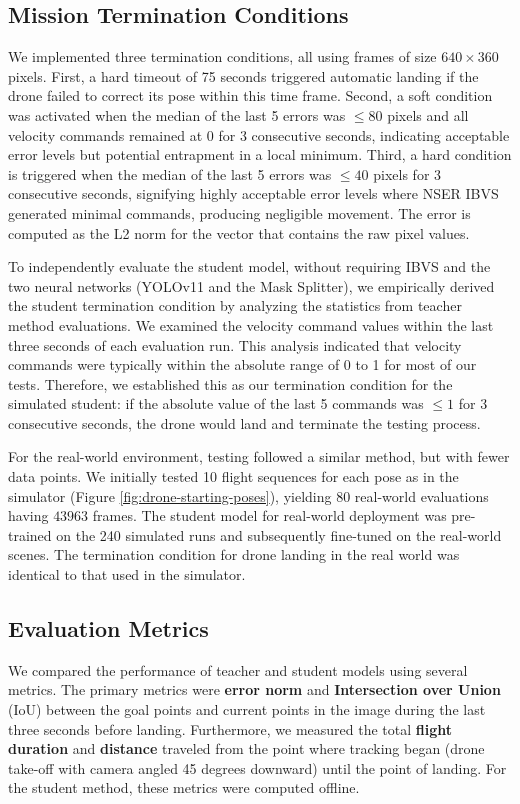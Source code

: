 \documentclass[10pt,twocolumn,letterpaper]{article}
\begin{document}
\subsection{Mission Termination Conditions}
\label{subsed:experiments-termination-conditions}
We implemented three termination conditions, all using frames of size $640 \times 360$ pixels. First, a hard timeout of 75 seconds triggered automatic landing if the drone failed to correct its pose within this time frame. Second, a soft condition was activated when the median of the last 5 errors was $\leq 80$ pixels and all velocity commands remained at 0 for 3 consecutive seconds, indicating acceptable error levels but potential entrapment in a local minimum. Third, a hard condition is triggered when the median of the last 5 errors was $\leq 40$ pixels for 3 consecutive seconds, signifying highly acceptable error levels where NSER IBVS generated minimal commands, producing negligible movement. The error is computed as the L2 norm for the vector that contains the raw pixel values.

To independently evaluate the student model, without requiring IBVS and the two neural networks (YOLOv11 and the Mask Splitter), we empirically derived the student termination condition by analyzing the statistics from teacher method evaluations. We examined the velocity command values within the last three seconds of each evaluation run. This analysis indicated that velocity commands were typically within the absolute range of 0 to 1 for most of our tests. Therefore, we established this as our termination condition for the simulated student: if the absolute value of the last 5 commands was $\leq 1$ for 3 consecutive seconds, the drone would land and terminate the testing process.

For the real-world environment, testing followed a similar method, but with fewer data points. We initially tested 10 flight sequences for each pose as in the simulator (Figure \ref{fig:drone-starting-poses}), yielding 80 real-world evaluations having $43963$ frames. The student model for real-world deployment was pre-trained on the 240 simulated runs and subsequently fine-tuned on the real-world scenes. The termination condition for drone landing in the real world was identical to that used in the simulator.


\subsection{Evaluation Metrics}
\label{subsec:experiments-metrics}
We compared the performance of teacher and student models using several metrics. The primary metrics were \textbf{error norm} and \textbf{Intersection over Union} (IoU) between the goal points and current points in the image during the last three seconds before landing. Furthermore, we measured the total \textbf{flight duration} and \textbf{distance} traveled from the point where tracking began (drone take-off with camera angled 45 degrees downward) until the point of landing. For the student method, these metrics were computed offline.
\end{document}
